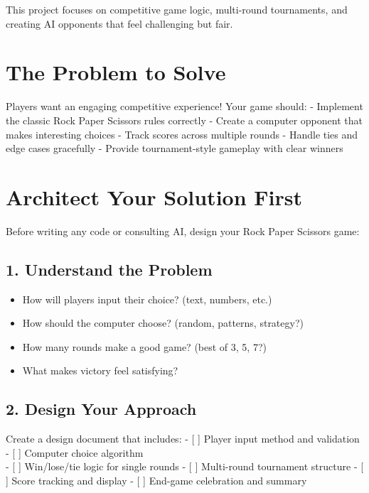 \documentclass[
  letterpaper,
  DIV=11,
  numbers=noendperiod,
  oneside]{scrreprt}
\providecommand{\tightlist}{%
  \setlength{\itemsep}{0pt}\setlength{\parskip}{0pt}}\usepackage{longtable,booktabs,array}
\begin{document}
This project focuses on competitive game logic, multi-round tournaments,
and creating AI opponents that feel challenging but fair.

\section{The Problem to Solve}\label{the-problem-to-solve-3}

Players want an engaging competitive experience! Your game should: -
Implement the classic Rock Paper Scissors rules correctly - Create a
computer opponent that makes interesting choices - Track scores across
multiple rounds - Handle ties and edge cases gracefully - Provide
tournament-style gameplay with clear winners

\section{Architect Your Solution
First}\label{architect-your-solution-first-3}

Before writing any code or consulting AI, design your Rock Paper
Scissors game:

\subsection{1. Understand the Problem}\label{understand-the-problem-3}

\begin{itemize}
\tightlist
\item
  How will players input their choice? (text, numbers, etc.)
\item
  How should the computer choose? (random, patterns, strategy?)
\item
  How many rounds make a good game? (best of 3, 5, 7?)
\item
  What makes victory feel satisfying?
\end{itemize}

\subsection{2. Design Your Approach}\label{design-your-approach-3}

Create a design document that includes: - {[} {]} Player input method
and validation - {[} {]} Computer choice algorithm\\
- {[} {]} Win/lose/tie logic for single rounds - {[} {]} Multi-round
tournament structure - {[} {]} Score tracking and display - {[} {]}
End-game celebration and summary
\end{document}
